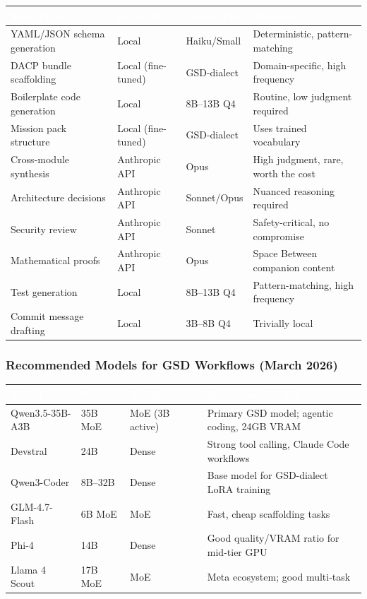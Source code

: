 \documentclass[11pt,letterpaper]{article}
\newcommand{\tableheader}[1]{\textbf{\sffamily\textcolor{white}{#1}}}
\begin{document}
\begin{center}
\begin{tabularx}{\textwidth}{L{3.5cm}L{2.5cm}L{2.5cm}X}
\toprule
{}
\tableheader{Task Type} & \tableheader{Route To} & \tableheader{Model Tier} & \tableheader{Rationale} \\
\midrule
YAML/JSON schema generation & Local & Haiku/Small & Deterministic, pattern-matching \\
DACP bundle scaffolding & Local (fine-tuned) & GSD-dialect & Domain-specific, high frequency \\
Boilerplate code generation & Local & 8B--13B Q4 & Routine, low judgment required \\
Mission pack structure & Local (fine-tuned) & GSD-dialect & Uses trained vocabulary \\
Cross-module synthesis & Anthropic API & Opus & High judgment, rare, worth the cost \\
Architecture decisions & Anthropic API & Sonnet/Opus & Nuanced reasoning required \\
Security review & Anthropic API & Sonnet & Safety-critical, no compromise \\
Mathematical proofs & Anthropic API & Opus & Space Between companion content \\
Test generation & Local & 8B--13B Q4 & Pattern-matching, high frequency \\
Commit message drafting & Local & 3B--8B Q4 & Trivially local \\
\bottomrule
\end{tabularx}
\end{center}

\subsubsection{Recommended Models for GSD Workflows (March 2026)}

\begin{center}
\begin{tabularx}{\textwidth}{L{3.5cm}L{2cm}L{2.5cm}X}
\toprule
{}
\tableheader{Model} & \tableheader{Params} & \tableheader{Architecture} & \tableheader{Recommended For} \\
\midrule
Qwen3.5-35B-A3B & 35B MoE & MoE (3B active) & Primary GSD model; agentic coding, 24GB VRAM \\
Devstral & 24B & Dense & Strong tool calling, Claude Code workflows \\
Qwen3-Coder & 8B--32B & Dense & Base model for GSD-dialect LoRA training \\
GLM-4.7-Flash & 6B MoE & MoE & Fast, cheap scaffolding tasks \\
Phi-4 & 14B & Dense & Good quality/VRAM ratio for mid-tier GPU \\
Llama 4 Scout & 17B MoE & MoE & Meta ecosystem; good multi-task \\
\bottomrule
\end{tabularx}
\end{center}
\end{document}
